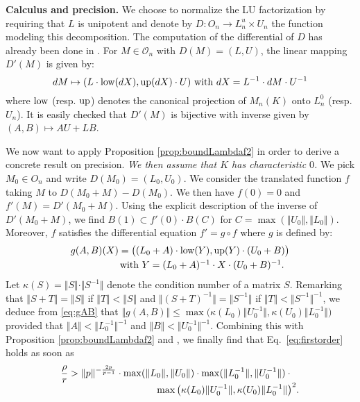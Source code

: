 \documentclass{sig-alternate}
\renewcommand{\O}{\mathcal O}
\newcommand{\low}{\text{\rm low}}
\newcommand{\up}{\text{\rm up}}
\begin{document}
\noindent
{\bf Calculus and precision.}
We choose to normalize the LU factorization by requiring that $L$ is 
unipotent and denote by $D : O_n \to L_n^u \times U_n$ the function 
modeling this decomposition. The computation of the differential of $D$ 
has already been done in \cite[Appendix B]{caruso-roe-vaccon:14a}. For
$M \in \O_n$ with $D(M) = (L,U)$, the linear mapping $D'(M)$ is given 
by:
$$
dM \mapsto (L \cdot \low(dX), \up(dX) \cdot U)
\text{ with } dX = L^{-1} \cdot dM \cdot U^{-1}
$$
where $\low$ (resp. $\up$) denotes the canonical projection of $M_n(K)$ 
onto $L_n^0$ (resp. $U_n$). 
It is easily checked that $D'(M)$ is bijective with inverse given by
$(A,B) \mapsto AU+LB$.

We now want to apply Proposition \ref{prop:boundLambdaf2} in order to 
derive a concrete result on precision. \emph{We then assume that $K$ has 
characteristic $0$.} We pick $M_0 \in
O_n$ and write $D(M_0) = (L_0,U_0)$. We consider the translated
function $f$ taking $M$ to $D(M_0+M)-D(M_0)$. We then have $f(0) = 0$ 
and $f'(M) = D'(M_0+M)$. Using the explicit description of the inverse
of $D'(M_0+M)$, we find $B(1) \subset f'(0) \cdot B(C)$
for $C = \max(\Vert U_0 \Vert, \Vert L_0 \Vert)$. Moreover, $f$ satisfies 
the differential equation $f' = g \circ f$ where $g$ is defined by:
\begin{equation}
\label{eq:gAB}
\begin{array}{l}
g(A,B)(X) = \big( (L_0+A) \cdot \low(Y), \up(Y) \cdot (U_0+B) \big)
\smallskip \\
\hspace{1.8cm}\text{with } Y = (L_0+A)^{-1} \cdot X \cdot (U_0+B)^{-1}.
\end{array}
\end{equation}
Let $\kappa(S) = \Vert S \Vert \cdot \Vert S^{-1} \Vert$ denote the 
condition number of a matrix $S$. Remarking that $\Vert S + T 
\Vert = \Vert S \Vert$ if $\Vert T \Vert < \Vert S \Vert$ and $\Vert (S 
+ T)^{-1} \Vert = \Vert S^{-1} \Vert$ if $\Vert T \Vert < \Vert S^{-1} 
\Vert^{-1}$, we deduce from \eqref{eq:gAB} that
$\Vert g(A,B) \Vert \leq \max 
\big( \kappa(L_0) \Vert U_0^{-1} \Vert, 
\kappa(U_0) \Vert L_0^{-1} \Vert \big)$
provided that $\Vert A \Vert < \Vert L_0^{-1} \Vert^{-1}$ and 
$\Vert B \Vert < \Vert U_0^{-1} \Vert^{-1}$.
Combining this with Proposition \ref{prop:boundLambdaf2} and 
\cite[Proposition.~3.12]{caruso-roe-vaccon:14a}, we finally find that 
Eq.~\eqref{eq:firstorder} holds as soon as 
$$\begin{array}{l}
\displaystyle \frac \rho r > \Vert p \Vert^{-\frac{2p}{p-1}} \cdot
\max ( \Vert L_0 \Vert, \Vert U_0 \Vert) \cdot
\max ( \Vert L_0 ^{-1} \Vert, \Vert U_0 ^{-1} \Vert) \cdot{} \\
\hspace{3.5cm} \max \big( \kappa(L_0) \Vert U_0^{-1} \Vert, 
  \kappa(U_0) \Vert L_0^{-1} \Vert \big)^2.
\end{array}$$
\end{document}
